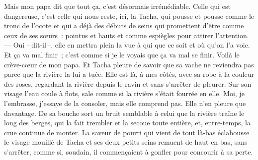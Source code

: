 \pend
%
\pstart
	Mais mon papa dit que tout ça, c'est désormais irrémédiable. Celle qui est dangereuse, c’est celle qui nous reste, ici, la Tacha, qui pousse et pousse comme le tronc de l’ocote et qui a déjà des débuts de seins qui promettent d’être comme ceux de ses sœurs : pointus et hauts et comme espiègles pour attirer l’attention.
\pend
%
\pstart
	--- Oui --\,dit-il\,--, elle en mettra plein la vue à qui que ce soit et où qu'on l'a voie. Et ça va mal finir ; c’est comme si je le voyais que ça va mal se finir.
\pend
%
\pstart
	Voilà le crève-cœur de mon papa.
\pend
%
\pstart
	Et Tacha pleure de savoir que sa vache ne reviendra pas parce que la rivière la lui a tuée. Elle est là, à mes côtés, avec sa robe à la couleur des roses, regardant la rivière depuis le ravin et sans s’arrêter de pleurer. Sur son visage l’eau coule à flots, sale comme si la rivière s’était fourrée en elle.
\pend
%
\pstart
	Moi, je l’embrasse, j’essaye de la consoler, mais elle comprend pas. Elle n’en pleure que davantage. De sa bouche sort un bruit semblable à celui que la rivière traîne le long des berges, qui la fait trembler et la secoue toute entière, et, entre-temps, la crue continue de monter. La saveur de pourri qui vient de tout là-bas éclabousse le visage mouillé de Tacha et ses deux petits seins remuent de haut en bas, sans s’arrêter, comme si, soudain, il commençaient à gonfler pour concourir à sa perte.
\pend
